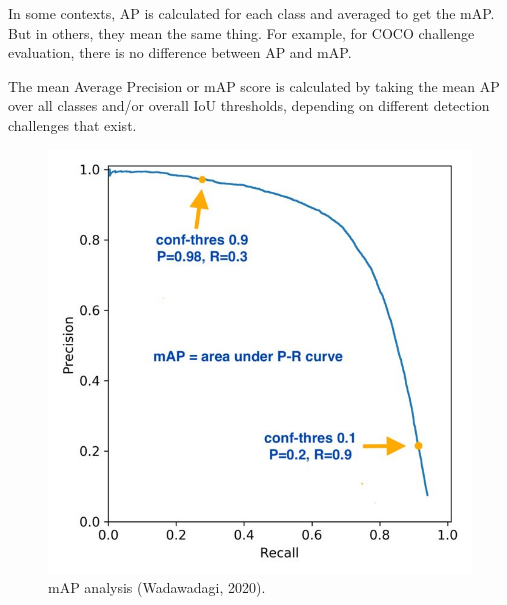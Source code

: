 \documentclass[]{article}
\begin{document}
In some contexts, AP is calculated for each class and averaged to get the mAP. But in others, they mean the same thing. For example, for COCO challenge evaluation, there is no difference between AP and mAP.

The mean Average Precision or mAP score is calculated by taking the mean AP over all classes and/or overall IoU thresholds, depending on different detection challenges that exist.

\begin{figure}[!h]
	\includegraphics[scale=0.95]{map}
	\caption{mAP analysis (Wadawadagi, 2020).}
	\label{Fig:Race}
\end{figure}
\end{document}
